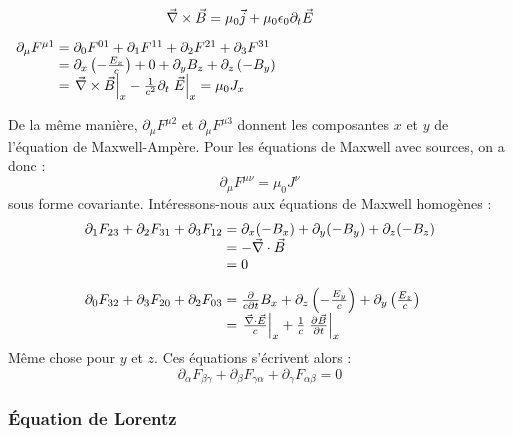 \begin{minipage}{0.35\linewidth}
$$\vec{\nabla}\times\vec{B}=\mu_0\vec{j}+\mu_0\epsilon_0\partial_t\vec{E} \text{\hspace{1cm}}$$
\end{minipage}
\begin{minipage}{0.55\linewidth}
$
	\begin{array}{r@{\;}l}
		\partial_\mu F^{\mu 1}&=\partial_0F^{01}+\partial_1F^{11}+\partial_2F^{21}+\partial_3F^{31}\\
		&=\partial_x\left(-\frac{E_x}{c}\right)+0+\partial_yB_z+\partial_z\left(-B_y\right)\\
		&=\left.\nab\times\vec{B}\right|_x-\frac{1}{c^2}\partial_t\left.\vec{E}\right|_x=\mu_0J_x
	\end{array}
$
\end{minipage}
\vspace{0.5cm}

\noindent De la m\^eme manière, $\partial_\mu F^{\mu 2}$ et $\partial_\mu F^{\mu 3}$ donnent les composantes $x$ et $y$ de l'équation de Maxwell-Ampère.
Pour les équations de Maxwell avec sources, on a donc :
$$
	\boxed{\partial_\mu F^{\mu\nu}=\mu_0J^\nu}
$$
sous forme covariante. Intéressons-nous aux équations de Maxwell homogènes :
$$
	\begin{array}{r@{\;}l}
		\partial_1F_{23}+\partial_2F_{31}+\partial_3F_{12}&=\partial_x(-B_x)+\partial_y(-B_y)+\partial_z(-B_z)\\
			&= -\nab\cdot\vec{B}\\
			&= 0 \\[10pt]
		\partial_0F_{32}+\partial_3F_{20}+\partial_2F_{03}&=\frac{\partial}{c\partial t}B_x+\partial_z\left(-\frac{E_y}{c}\right)+\partial_y\left(\frac{E_z}{c}\right)\\
			&=\left.\frac{\nab\cdot\vec{E}}{c}\right|_x+\frac{1}{c}\left.\frac{\partial \vec{B}}{\partial t}\right|_x
	\end{array}
$$
M\^eme chose pour $y$ et $z$. Ces équations s'écrivent alors :
$$
	\boxed{\partial_\alpha F_{\beta\gamma} + \partial_\beta F_{\gamma\alpha} + \partial_\gamma F_{\alpha\beta} = 0}
$$

\subsubsection*{Équation de Lorentz}

